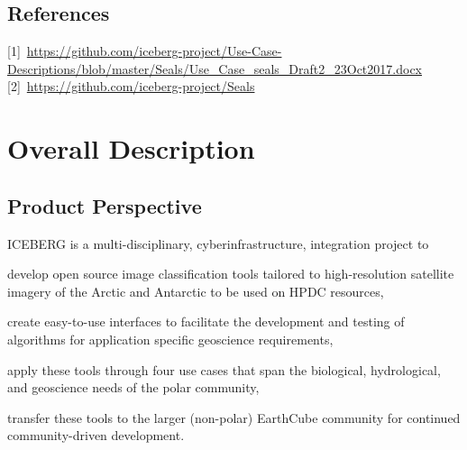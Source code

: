 \documentclass{scrreprt}
\begin{document}
\section{References}
[1]~\url{https://github.com/iceberg-project/Use-Case-Descriptions/blob/master/Seals/Use_Case_seals_Draft2_23Oct2017.docx}
[2]~\url{https://github.com/iceberg-project/Seals}

\chapter{Overall Description}

\section{Product Perspective}

ICEBERG is a multi-disciplinary, cyberinfrastructure, integration project to 
\begin{inparaenum}[(1)]
    \item develop open source image classification tools tailored to high-resolution 
	satellite imagery of the Arctic and Antarctic to be used on HPDC resources,
	\item create easy-to-use interfaces to facilitate the development and testing 
	of algorithms for application specific geoscience requirements,
	\item apply these tools through four use cases that span the biological, 
	hydrological, and geoscience needs of the polar community,
	\item transfer these tools to the larger (non-polar) EarthCube community for 
	continued community-driven development.
\end{inparaenum}
\end{document}
